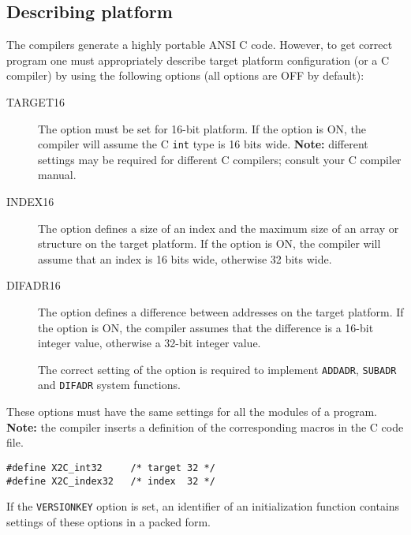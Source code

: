 \subsection{Describing platform}\label{maptoc:opt:config}

The \xds{}  compilers  generate a highly  portable  ANSI  C  code.
However,  to  get  correct program one must appropriately describe
target  platform  configuration  (or  a  C  compiler) by using the
following options (all options are OFF by default):
\begin{description}
\item[TARGET16]  \mbox{}

        The option must be set for 16-bit platform.
        If the option is ON, the compiler will assume the C {\tt int}
        type is 16 bits wide.
        {\bf Note:} different settings may be required for
        different C compilers; consult your C compiler manual.

\item[INDEX16]    \mbox{}

        The option defines a size of an index and the maximum size of
        an array or structure on the target platform.
        If the option is ON, the compiler will assume that
        an index is 16 bits wide, otherwise 32 bits wide.

\item[DIFADR16]  \mbox{}

        The option defines a difference between addresses
        on the target  platform.
        If the option is ON, the compiler assumes that the difference
        is a 16-bit integer value, otherwise a 32-bit integer value.

        The correct setting of the option is required to
        implement {\tt ADDADR}, {\tt SUBADR} and {\tt DIFADR}
        system functions.
\end{description}

These options must have the same settings for all the modules
of a program. {\bf Note:} the compiler inserts a definition of
the corresponding macros in the C code file.
\begin{verbatim}
#define X2C_int32     /* target 32 */
#define X2C_index32   /* index  32 */
\end{verbatim}

If the {\tt VERSIONKEY} option is set, an identifier of
an initialization function contains settings of these options
in a packed form.

